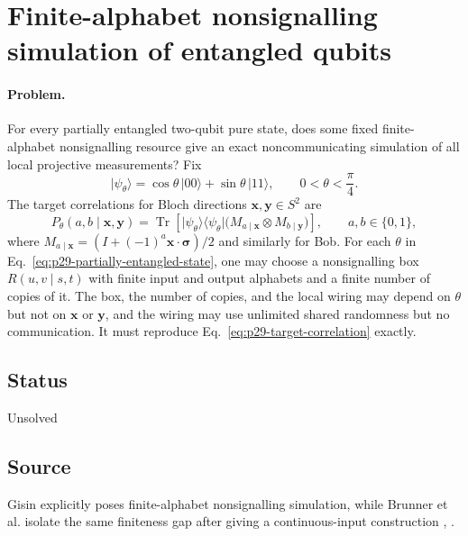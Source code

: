 \section{Finite-alphabet nonsignalling simulation of entangled qubits}
\label{sec:problem-29}

\paragraph{Problem.}
For every partially entangled two-qubit pure state, does some fixed
finite-alphabet nonsignalling resource give an exact noncommunicating
simulation of all local projective measurements?  Fix
\begin{equation}
  \lvert\psi_\theta\rangle
  =\cos\theta\,\lvert00\rangle+\sin\theta\,\lvert11\rangle,
  \qquad 0<\theta<\frac{\pi}{4}.
  \label{eq:p29-partially-entangled-state}
\end{equation}
The target correlations for Bloch directions
$\mathbf x,\mathbf y\in S^2$ are
\begin{equation}
  P_\theta(a,b\mid\mathbf x,\mathbf y)
  =\operatorname{Tr}\!\left[
    \lvert\psi_\theta\rangle\!\langle\psi_\theta\rvert
    \bigl(M_{a\mid\mathbf x}\otimes M_{b\mid\mathbf y}\bigr)
    \right],
  \qquad a,b\in\{0,1\},
  \label{eq:p29-target-correlation}
\end{equation}
where $M_{a\mid\mathbf x}=(I+(-1)^a\mathbf x\cdot\boldsymbol\sigma)/2$
and similarly for Bob.  For each $\theta$ in
Eq.~\eqref{eq:p29-partially-entangled-state}, one may choose a nonsignalling
box $R(u,v\mid s,t)$ with finite input and output alphabets and a finite
number of copies of it.  The box, the number of copies, and the local wiring
may depend on $\theta$ but not on $\mathbf x$ or $\mathbf y$, and the wiring
may use unlimited shared randomness but no communication.  It must reproduce
Eq.~\eqref{eq:p29-target-correlation} exactly.

\subsection*{Status}

Unsolved

\subsection*{Source}

Gisin explicitly poses finite-alphabet nonsignalling simulation, while
Brunner et al. isolate the same finiteness gap after giving a continuous-input
construction ,
.

